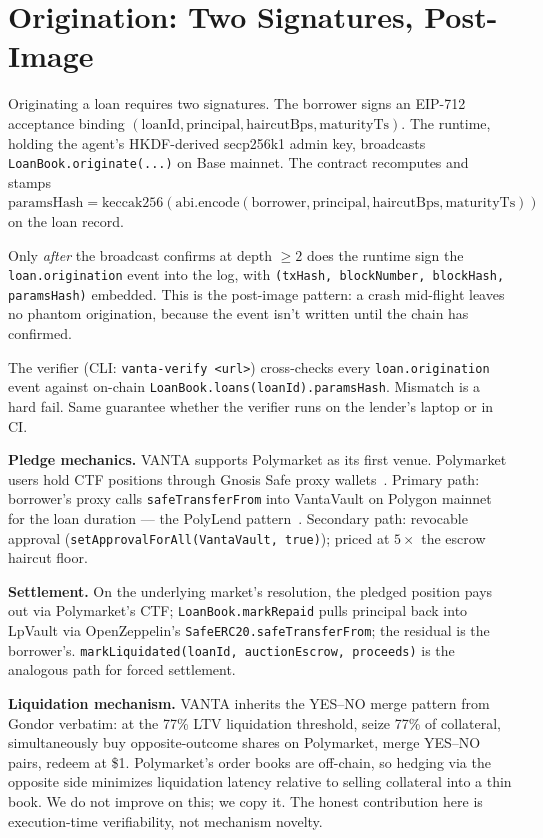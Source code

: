 \documentclass[11pt,letterpaper]{article}
\begin{document}
\section{Origination: Two Signatures, Post-Image}
\label{sec:settlement}

Originating a loan requires two signatures. The borrower signs an EIP-712 acceptance binding $(\text{loanId}, \text{principal}, \text{haircutBps}, \text{maturityTs})$. The runtime, holding the agent's HKDF-derived secp256k1 admin key, broadcasts \texttt{LoanBook.originate(...)} on Base mainnet. The contract recomputes and stamps $\text{paramsHash} = \text{keccak256}(\text{abi.encode}(\text{borrower}, \text{principal}, \text{haircutBps}, \text{maturityTs}))$ on the loan record.

Only \emph{after} the broadcast confirms at depth $\geq 2$ does the runtime sign the \texttt{loan.origination} event into the log, with \texttt{(txHash, blockNumber, blockHash, paramsHash)} embedded. This is the post-image pattern: a crash mid-flight leaves no phantom origination, because the event isn't written until the chain has confirmed.

The verifier (CLI: \texttt{vanta-verify <url>}) cross-checks every \texttt{loan.origination} event against on-chain \texttt{LoanBook.loans(loanId).paramsHash}. Mismatch is a hard fail. Same guarantee whether the verifier runs on the lender's laptop or in CI.

\textbf{Pledge mechanics.} VANTA supports Polymarket as its first venue. Polymarket users hold CTF positions through Gnosis Safe proxy wallets~\cite{polymarket-proxy}. Primary path: borrower's proxy calls \texttt{safeTransferFrom} into VantaVault on Polygon mainnet for the loan duration --- the PolyLend pattern~\cite{polylend}. Secondary path: revocable approval (\texttt{setApprovalForAll(VantaVault, true)}); priced at $5\times$ the escrow haircut floor.

\textbf{Settlement.} On the underlying market's resolution, the pledged position pays out via Polymarket's CTF; \texttt{LoanBook.markRepaid} pulls principal back into LpVault via OpenZeppelin's \texttt{SafeERC20.safeTransferFrom}; the residual is the borrower's. \texttt{markLiquidated(loanId, auctionEscrow, proceeds)} is the analogous path for forced settlement.

\textbf{Liquidation mechanism.} VANTA inherits the YES--NO merge pattern from Gondor verbatim: at the 77\% LTV liquidation threshold, seize 77\% of collateral, simultaneously buy opposite-outcome shares on Polymarket, merge YES--NO pairs, redeem at \$1. Polymarket's order books are off-chain, so hedging via the opposite side minimizes liquidation latency relative to selling collateral into a thin book. We do not improve on this; we copy it. The honest contribution here is execution-time verifiability, not mechanism novelty.
\end{document}
